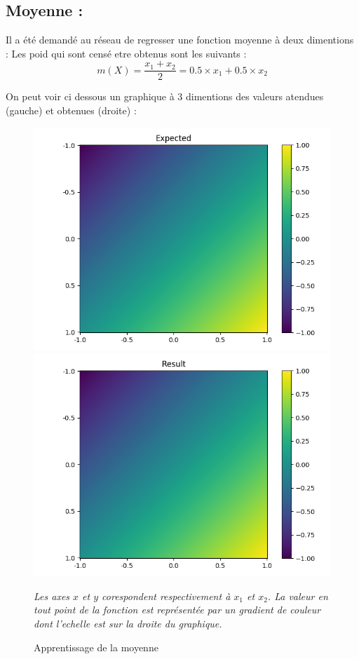 
\subsection{Moyenne :}\label{subsec:moy}
Il a été demandé au réseau de regresser une fonction moyenne à deux dimentions :
Les poid qui sont censé etre obtenus sont les suivants :
\begin{equation}
    \label{eq:moy}
    m(X) =\frac{x_1 + x_2}{2} = 0.5 \times x_1 + 0.5 \times x_2
\end{equation}

On peut voir ci dessous un graphique à 3 dimentions des valeurs atendues (gauche) et obtenues (droite) :
\begin{figure}[H]
    \center
    \includegraphics[height=\petit]{pict/moy/expected}
    \includegraphics[height=\petit]{pict/moy/result}
	\caption{Apprentissage de la moyenne}
    \vspace{-10pt}
    \begin{center}
        \tiny
        \textit{
        Les axes $x$ et $y$ corespondent respectivement à $x_1$ et $x_2$.
        La valeur en tout point de la fonction est représentée par un gradient de couleur
        dont l'echelle est sur la droite du graphique.
        }
    \end{center}
	\label{fig:moy}
\end{figure}
\vspace{-12pt}

